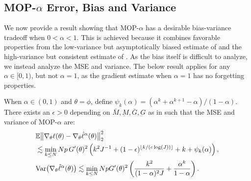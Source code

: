 \documentclass[numsec,webpdf,modern,medium,namedate]{oup-authoring-template}
\newcommand\arxiv[2]{#2} %
\theoremstyle{thmstyleone}%
\theoremstyle{thmstyletwo}%
\theoremstyle{thmstylethree}%
\begin{document}
\subsection{MOP-$\alpha$ Error, Bias and Variance}

We now provide a result showing that MOP-$\alpha$ has a desirable bias-variance tradeoff when $0<\alpha<1$.
This is achieved because it combines favorable properties from the low-variance but asymptotically biased estimate of \cite{naesseth18} and the high-variance but consistent estimate of \cite{poyiadjis11}. 
As the bias itself is difficult to analyze, we instead analyze the MSE and variance. 
The below result applies for any $\alpha \in [0,1)$, but not $\alpha=1$, as the gradient estimate when $\alpha=1$ has no forgetting properties. 

\begin{thm}
    \label{thm:mop-biasvar}
    When $\alpha\in (0,1)$ and $\theta=\phi$, define $\psi_k(\alpha)=(\alpha^k  + \alpha^{k+1} - \alpha)/(1-\alpha)$. 
    There exists an $\epsilon>0$ depending on $\bar{M}, \underbar{M}, \bar{G}, \underbar{G}$ as in \cite{karjalainen23} such that the MSE and variance of MOP-$\alpha$ are:
    \vspace*{-1ex}
    \arxiv{\begin{eqnarray}
        \E\big\|\nabla_\theta\ell(\theta) - \nabla_\theta \hat\ell^\alpha(\theta)\big\|_2^2 
        &\lesssim& \min_{k \leq N} Np \, G'(\theta)^2\left(k^2J^{-1}+(1-\epsilon)^{\floor{k/(c\log(J))}}+k+\psi_k(\alpha)\right), \label{eq:mop-mse}
        \\
        \Var\big(\nabla_\theta \hat\ell^{\alpha}(\theta)\big) &\lesssim& \min_{k\leq N} Np \, G'(\theta)^2\left(\frac{k^2}{(1-\alpha)^2J} + \frac{\alpha^{k}}{1-\alpha}N\right). \label{eq:mop-variance}
        \end{eqnarray}}{\begin{align}
        &\mathbb{E}\big\|\nabla_\theta\ell(\theta) - \nabla_\theta \hat\ell^\alpha(\theta)\big\|_2^2 \label{eq:mop-mse}\\
        &\lesssim \min_{k \leq N} Np \, G'(\theta)^2\left(k^2J^{-1}+(1-\epsilon)^{\lfloor k/(c\log(J)) \rfloor}+k+\psi_k(\alpha)\right), \nonumber 
        \\
        &\mathrm{Var}\big(\nabla_\theta \hat\ell^{\alpha}(\theta)\big) \lesssim \min_{k\leq N} Np  G'(\theta)^2\left(\frac{k^2}{(1-\alpha)^2J} + \frac{\alpha^{k}}{1-\alpha}\right). \label{eq:mop-variance}
        \end{align}}
\end{thm}
\arxiv{}{\vspace*{-1ex}}
\end{document}
